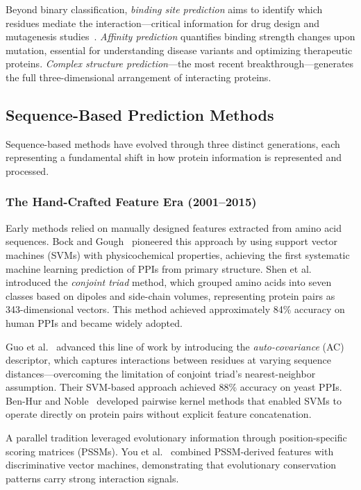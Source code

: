 Beyond binary classification, \textit{binding site prediction} aims to identify which residues mediate the interaction---critical information for drug design and mutagenesis studies~\cite{ortegon2020binding}. \textit{Affinity prediction} quantifies binding strength changes upon mutation, essential for understanding disease variants and optimizing therapeutic proteins. \textit{Complex structure prediction}---the most recent breakthrough---generates the full three-dimensional arrangement of interacting proteins.

\subsection{Sequence-Based Prediction Methods}
\label{subsec:sequence}

Sequence-based methods have evolved through three distinct generations, each representing a fundamental shift in how protein information is represented and processed.

\subsubsection{The Hand-Crafted Feature Era (2001--2015)}

Early methods relied on manually designed features extracted from amino acid sequences. Bock and Gough~\cite{bock2001predicting} pioneered this approach by using support vector machines (SVMs) with physicochemical properties, achieving the first systematic machine learning prediction of PPIs from primary structure. Shen et al.~\cite{shen2007predicting} introduced the \textit{conjoint triad} method, which grouped amino acids into seven classes based on dipoles and side-chain volumes, representing protein pairs as 343-dimensional vectors. This method achieved approximately 84\% accuracy on human PPIs and became widely adopted.

Guo et al.~\cite{guo2008using} advanced this line of work by introducing the \textit{auto-covariance} (AC) descriptor, which captures interactions between residues at varying sequence distances---overcoming the limitation of conjoint triad's nearest-neighbor assumption. Their SVM-based approach achieved 88\% accuracy on yeast PPIs. Ben-Hur and Noble~\cite{benhur2005kernel} developed pairwise kernel methods that enabled SVMs to operate directly on protein pairs without explicit feature concatenation.

A parallel tradition leveraged evolutionary information through position-specific scoring matrices (PSSMs). You et al.~\cite{you2017pssm} combined PSSM-derived features with discriminative vector machines, demonstrating that evolutionary conservation patterns carry strong interaction signals.

